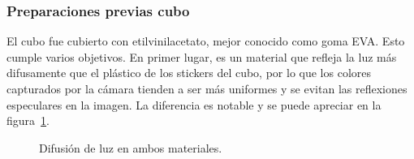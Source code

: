 \subsubsection{Preparaciones previas cubo}
El cubo fue cubierto con etilvinilacetato, mejor conocido como goma EVA. Esto cumple varios objetivos. En primer lugar, es un material que refleja la luz más difusamente que el plástico de los stickers del cubo, por lo que los colores capturados por la cámara tienden a ser más uniformes y se evitan las reflexiones especulares en la imagen. La diferencia es notable y se puede apreciar en la figura~\ref{luz}.

\begin{figure}[h!]
	\centering
	\caption{Difusión de luz en ambos materiales.}
	\label{luz}
\end{figure}

